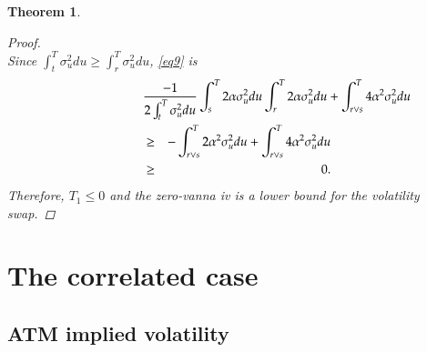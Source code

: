 \documentclass[11pt]{article}
\newtheorem{theorem}{Theorem}
\begin{document}
\begin{theorem}
\begin{proof}
\begin{equation}
\label{eq9}
\end{equation}
Since $\int_t^T \sigma_u^2 du \ge \int_r^T \sigma_u^2 du$, \eqref{eq9} is
\begin{eqnarray}
\lefteqn{\frac{-1}{2 \int_t^T \sigma_u^2 du}\int_s^T 2\alpha \sigma_u^2 du\int_r^T 2\alpha \sigma_u^2 du+\int_{r\vee s}^T 4\alpha^2 \sigma_u^2 du} \nonumber\\
&\ge& - \int_{r\vee s}^T 2\alpha^2 \sigma_u^2 du+\int_{r\vee s}^T 4\alpha^2 \sigma_u^2 du \nonumber\\
&\ge& 0.
\end{eqnarray}
Therefore, $T_1 \le 0$ and the zero-vanna iv is a lower bound for the volatility swap.
\end{proof}
\end{theorem}


\section{The correlated case}

\subsection{ATM implied volatility}
\end{document}

